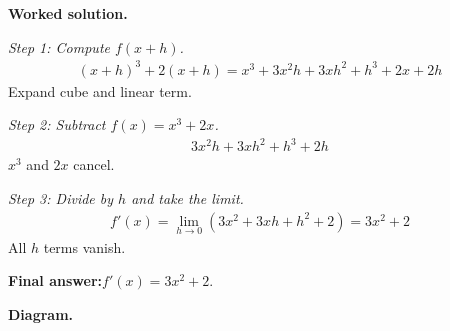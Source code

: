 \documentclass[11pt]{article}
\begin{document}
\textbf{Worked solution.}

\textit{Step 1: Compute \( f(x+h) \).}
\[\begin{gathered}
(x+h)^3 + 2(x+h) = x^3 + 3x^2h + 3xh^2 + h^3 + 2x + 2h
\end{gathered}\]
Expand cube and linear term.

\textit{Step 2: Subtract \( f(x) = x^3 + 2x \).}
\[\begin{gathered}
3x^2h + 3xh^2 + h^3 + 2h
\end{gathered}\]
\( x^3 \) and \( 2x \) cancel.

\textit{Step 3: Divide by \( h \) and take the limit.}
\[\begin{gathered}
f'(x) = \lim_{h \to 0}(3x^2 + 3xh + h^2 + 2) = 3x^2 + 2
\end{gathered}\]
All \( h \) terms vanish.

\begin{answerbox}
\textbf{Final answer:}\quad \(\displaystyle  f'(x) = 3x^2 + 2 \).
\end{answerbox}
\textbf{Diagram.}
\end{document}
